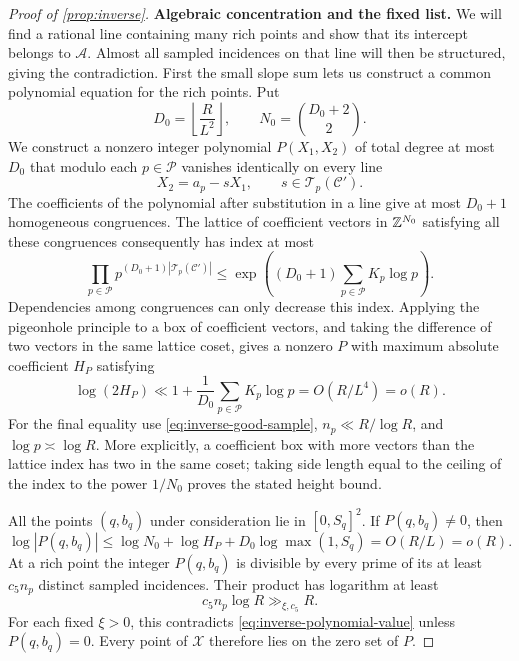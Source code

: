 \begin{proof}[Proof of \cref{prop:inverse}]
\medskip
\textbf{Algebraic concentration and the fixed list.}
We will find a rational line containing many rich points and show that
its intercept belongs to \(\mathcal A\). Almost all sampled incidences
on that line will then be structured, giving the contradiction.
First the small slope sum lets us construct a common polynomial equation
for the rich points.
Put
\[
 D_0=\left\lfloor\frac{R}{L^2}\right\rfloor,
 \qquad N_0=\binom{D_0+2}{2}.
\]
We construct a nonzero integer polynomial \(P(X_1,X_2)\) of total
degree at most \(D_0\) that modulo each \(p\in\mathcal P\) vanishes
identically on every line
\[
 X_2=a_p-sX_1,\qquad s\in\mathcal T_p(\mathcal C').
\]
The coefficients of the polynomial after substitution in a line give
at most \(D_0+1\) homogeneous congruences.
The lattice of coefficient vectors in \(\mathbb Z^{N_0}\) satisfying all
these congruences consequently has index at most
\[
 \prod_{p\in\mathcal P}
      p^{(D_0+1)|\mathcal T_p(\mathcal C')|}
 \le
 \exp\!\left((D_0+1)\sum_{p\in\mathcal P}K_p\log p\right).
\]
Dependencies among congruences can only decrease this index.
Applying the pigeonhole principle to a box of coefficient vectors,
and taking the difference of two vectors in the same lattice coset,
gives a nonzero \(P\) with maximum absolute coefficient \(H_P\) satisfying
\begin{equation}
 \log(2H_P)
 \ll 1+\frac1{D_0}\sum_{p\in\mathcal P}K_p\log p
 =O(R/L^4)=o(R).
 \label{eq:inverse-polynomial-height}
\end{equation}
For the final equality use \eqref{eq:inverse-good-sample},
\(n_p\ll R/\log R\), and \(\log p\asymp\log R\).
More explicitly, a coefficient box with more vectors than the
lattice index has two in the same coset; taking side length equal
to the ceiling of the index to the power \(1/N_0\) proves the stated
height bound.

All the points \((q,b_q)\) under consideration lie in \([0,S_q]^2\).
If \(P(q,b_q)\ne0\), then
\begin{equation}
 \log|P(q,b_q)|
 \le \log N_0+\log H_P+D_0\log\max(1,S_q)
 =O(R/L)=o(R).
 \label{eq:inverse-polynomial-value}
\end{equation}
At a rich point the integer \(P(q,b_q)\) is divisible by every prime
of its at least \(c_5n_p\) distinct sampled incidences.
Their product has logarithm at least
\[
 c_5n_p\log R\gg_{\xi,c_5}R.
\]
For each fixed \(\xi>0\), this contradicts
\eqref{eq:inverse-polynomial-value} unless \(P(q,b_q)=0\).
Every point of \(\mathcal X\) therefore lies on the zero set of \(P\).


\end{proof}
